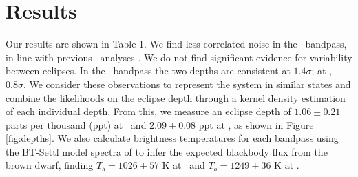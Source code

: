 \section{Results}

Our results are shown in Table 1. 
We find less correlated noise in the \irb\ bandpass, in line with
previous \spitz\ analyses \citep{Hora08}.
We do not find significant evidence for variability between eclipses.
In the \ira\ bandpass the two depths are consistent at $1.4 \sigma$;
at \irb, $0.8\sigma$.
We consider these observations to represent the system in similar states
and combine the likelihoods on the eclipse depth through a kernel density
estimation of each individual depth.
From this, we measure an eclipse depth of $1.06 \pm 0.21$ parts per thousand (ppt) at \ira\ and $2.09 \pm 0.08$ ppt
at \irb, as shown in Figure \ref{fig:depths}.
We also calculate brightness temperatures for each bandpass using the BT-Settl model spectra of \citet{Allard12}
to infer the expected blackbody flux from the brown dwarf, finding $T_b = 1026 \pm 57$ K at \ira\ and $T_b = 
1249 \pm 36$ K at \irb.

